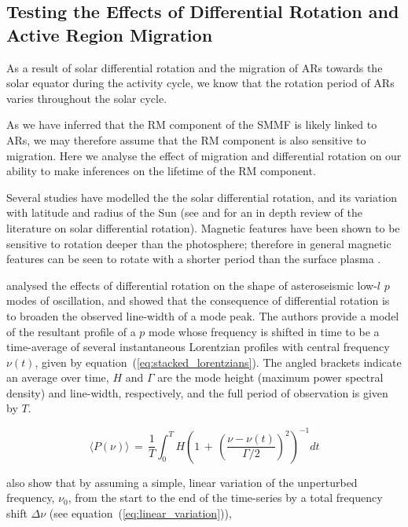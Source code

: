  
\subsection{Testing the Effects of Differential Rotation and Active Region Migration}
\label{sec:smearing}

As a result of solar differential rotation and the migration of ARs towards the solar equator during the activity cycle, we know that the rotation period of ARs varies throughout the solar cycle. 

As we have inferred that the RM component of the SMMF is likely linked to ARs, we may therefore assume that the RM component is also sensitive to migration. Here we analyse the effect of migration and differential rotation on our ability to make inferences on the lifetime of the RM component.

Several studies have modelled the the solar differential rotation, and its variation with latitude and radius of the Sun (see \citet{beck_comparison_2000} and \cite{howe_solar_2009} for an in depth review of the literature on solar differential rotation). Magnetic features have been shown to be sensitive to rotation deeper than the photosphere; therefore in general magnetic features can be seen to rotate with a shorter period than the surface plasma \citep{howe_solar_2009}.

\citet{chaplin_distortion_2008} analysed the effects of differential rotation on the shape of asteroseismic low-$l$ $p$ modes of oscillation, and showed that the consequence of differential rotation is to broaden the observed line-width of a mode peak. The authors provide a model of the resultant profile of a $p$ mode whose frequency is shifted in time to be a time-average of several instantaneous Lorentzian profiles with central frequency $\nu(t)$, given by equation~(\ref{eq:stacked_lorentzians}). The angled brackets indicate an average over time, $H$ and $\Gamma$ are the mode height (maximum power spectral density) and line-width, respectively, and the full period of observation is given by $T$.

\begin{equation}
\langle P(\nu) \rangle \, = \, \frac{1}{T} \int^T_0 H \left( 1 \, + \, \left( \frac{\nu - \nu(t)}{\Gamma /2} \right)^2 \right)^{-1} dt
\label{eq:stacked_lorentzians}
\end{equation}

\citet{chaplin_distortion_2008} also show that by assuming a simple, linear variation of the unperturbed frequency, $\nu_0$, from the start to the end of the time-series by a total frequency shift $\Delta\nu$ (see equation~(\ref{eq:linear_variation})),

